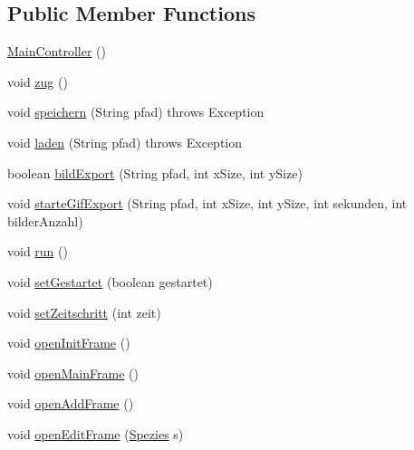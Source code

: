 \subsection*{Public Member Functions}
\begin{DoxyCompactItemize}
\item 
\hyperlink{classde_1_1gameoflife_1_1controllers_1_1MainController_a399df4ef87a2b1a71602f28fedb0b3d6}{Main\-Controller} ()
\item 
void \hyperlink{classde_1_1gameoflife_1_1controllers_1_1MainController_a4be3b9b2a993901333b84ba12223ee3a}{zug} ()
\item 
void \hyperlink{classde_1_1gameoflife_1_1controllers_1_1MainController_af0914e17f2b4dd1739860a34ffa37adc}{speichern} (String pfad)  throws Exception 	
\item 
void \hyperlink{classde_1_1gameoflife_1_1controllers_1_1MainController_a49d4d8eeee33c74da829f40717e463f2}{laden} (String pfad)  throws Exception 	
\item 
boolean \hyperlink{classde_1_1gameoflife_1_1controllers_1_1MainController_af7ce7b2a6bb9dc3bfa1b3a28c02a7e41}{bild\-Export} (String pfad, int x\-Size, int y\-Size)
\item 
void \hyperlink{classde_1_1gameoflife_1_1controllers_1_1MainController_a411ba574e6c3b43064921313a4abfbe6}{starte\-Gif\-Export} (String pfad, int x\-Size, int y\-Size, int sekunden, int bilder\-Anzahl)
\item 
void \hyperlink{classde_1_1gameoflife_1_1controllers_1_1MainController_a957b04a1e3947c6776cc8ab131ed9a55}{run} ()
\item 
void \hyperlink{classde_1_1gameoflife_1_1controllers_1_1MainController_a851df159a082fe350b6498cda33f1085}{set\-Gestartet} (boolean gestartet)
\item 
void \hyperlink{classde_1_1gameoflife_1_1controllers_1_1MainController_aeab7bbc933c0c6c5e8c7cfa65c4d1f89}{set\-Zeitschritt} (int zeit)
\item 
void \hyperlink{classde_1_1gameoflife_1_1controllers_1_1MainController_a7dd58971086fd347dc481d99402d5f32}{open\-Init\-Frame} ()
\item 
void \hyperlink{classde_1_1gameoflife_1_1controllers_1_1MainController_ab808bcc24bb9a683363d122f0583cc85}{open\-Main\-Frame} ()
\item 
void \hyperlink{classde_1_1gameoflife_1_1controllers_1_1MainController_a782842c3f39628443b0e6bc6dc2c286c}{open\-Add\-Frame} ()
\item 
void \hyperlink{classde_1_1gameoflife_1_1controllers_1_1MainController_ab7ace6aaa9f54b89d260e3ce67cc5813}{open\-Edit\-Frame} (\hyperlink{classde_1_1gameoflife_1_1models_1_1Spezies}{Spezies} s)

\end{DoxyCompactItemize}
